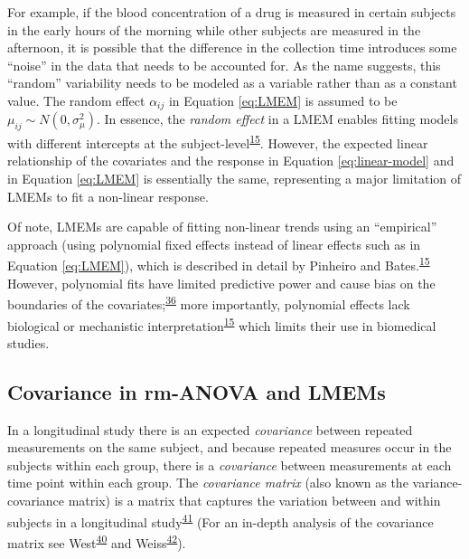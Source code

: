 \documentclass[
]{article}
\begin{document}
For example, if the blood concentration of a drug is measured in certain subjects in the early hours of the morning while other subjects are measured in the afternoon, it is possible that the difference in the collection time introduces some ``noise'' in the data that needs to be accounted for. As the name suggests, this ``random'' variability needs to be modeled as a variable rather than as a constant value. The random effect \(\alpha_{ij}\) in Equation \eqref{eq:LMEM} is assumed to be \(\mu_{ij} \sim N(0,\sigma^2_\mu)\). In essence, the \emph{random effect} in a LMEM enables fitting models with different intercepts at the subject-level\textsuperscript{\protect\hyperlink{ref-pinheiro2006}{15}}. However, the expected linear relationship of the covariates and the response in Equation \eqref{eq:linear-model} and in Equation \eqref{eq:LMEM} is essentially the same, representing a major limitation of LMEMs to fit a non-linear response.

Of note, LMEMs are capable of fitting non-linear trends using an ``empirical'' approach (using polynomial fixed effects instead of linear effects such as in Equation \eqref{eq:LMEM}), which is described in detail by Pinheiro and Bates.\textsuperscript{\protect\hyperlink{ref-pinheiro2006}{15}} However, polynomial fits have limited predictive power and cause bias on the boundaries of the covariates;\textsuperscript{\protect\hyperlink{ref-beck1998}{36}} more importantly, polynomial effects lack biological or mechanistic interpretation\textsuperscript{\protect\hyperlink{ref-pinheiro2006}{15}} which limits their use in biomedical studies.

\hypertarget{covariance-in-rm-anova-and-lmems}{%
\subsection{Covariance in rm-ANOVA and LMEMs}\label{covariance-in-rm-anova-and-lmems}}

In a longitudinal study there is an expected \emph{covariance} between repeated measurements on the same subject, and because repeated measures occur in the subjects within each group, there is a \emph{covariance} between measurements at each time point within each group. The \emph{covariance matrix} (also known as the variance-covariance matrix) is a matrix that captures the variation between and within subjects in a longitudinal study\textsuperscript{\protect\hyperlink{ref-wolfinger1996}{41}} (For an in-depth analysis of the covariance matrix see West\textsuperscript{\protect\hyperlink{ref-west2014}{40}} and Weiss\textsuperscript{\protect\hyperlink{ref-weiss2005}{42}}).
\end{document}
